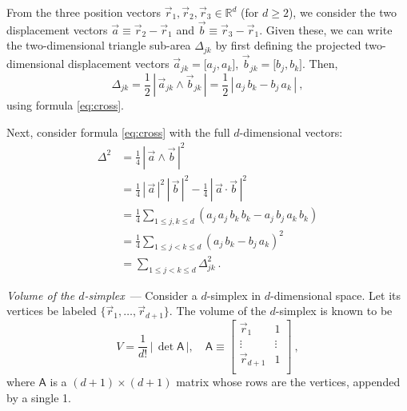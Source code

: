 \documentclass[10pt]{article}
\renewcommand{\paragraph}[1]{\par\addvspace{1em}\noindent\textsl{#1}~---}
\newcommand{\abs}[1]{|\,{#1}\,|}
\begin{document}
From the three position vectors $\vec{r}_1, \vec{r}_2, \vec{r}_3 \in \mathbb{R}^d$ (for $d \geq 2$), we consider the two displacement vectors $\vec{a} \equiv \vec{r}_2 - \vec{r}_1$ and $\vec{b} \equiv \vec{r}_3 - \vec{r}_1$.
Given these, we can write the two-dimensional triangle sub-area $\Delta_{jk}$ by first defining the projected two-dimensional displacement vectors $\vec{a}_{jk} = \big[ a_j, a_k \big]$, $\vec{b}_{jk} = \big[ b_j, b_k \big]$. Then,
\begin{equation}
    \Delta_{jk}
    = \frac{1}{2} \, \abs{ \vec{a}_{jk} \wedge \vec{b}_{jk} }
    = \frac{1}{2}
        \, \abs{a_j \, b_k - b_j \, a_k}~,
\end{equation}
using formula \eqref{eq:cross}.

Next, consider formula \eqref{eq:cross} with the full $d$-dimensional vectors:
\begin{align}
    \Delta^2
    &= \frac{1}{4}\, \abs{\vec{a} \wedge \vec{b}}^2 \nonumber\\
    &= \frac{1}{4}\, \abs{\vec{a}}^2 \, \abs{\vec{b}}^2 - \frac{1}{4}\, \abs{\vec{a} \cdot \vec{b}}^2 \nonumber\\
    &= \frac{1}{4} \sum_{1 \leq j, k \leq d}
        ( a_j \, a_j \, b_k \, b_k - a_j \, b_j \, a_k \, b_k ) \nonumber\\
    &= \frac{1}{4} \sum_{1 \leq j < k \leq d}
        ( a_j \, b_k - b_j \, a_k )^2 \nonumber\\
    &= \sum_{1 \leq j < k \leq d} \Delta_{jk}^2~.
\end{align}


\paragraph{Volume of the $d$-simplex} Consider a $d$-simplex in $d$-dimensional space. Let its vertices be labeled $\{ \vec{r}_1, \dots, \vec{r}_{d+1} \}$. The volume of the $d$-simplex is known to be
\begin{equation}
    V = \frac{1}{d!} \, \abs{\det \mathsf{A}},
    \quad \mathsf{A} \equiv \left[ \begin{array}{cc}
        \vec{r}_1 & 1 \\
        \vdots & \vdots \\
        \vec{r}_{d+1} & 1 \\
    \end{array} \right]~,
\end{equation}
where $\mathsf{A}$ is a $(d+1) \times (d+1)$ matrix whose rows are the vertices, appended by a single 1.
\end{document}
